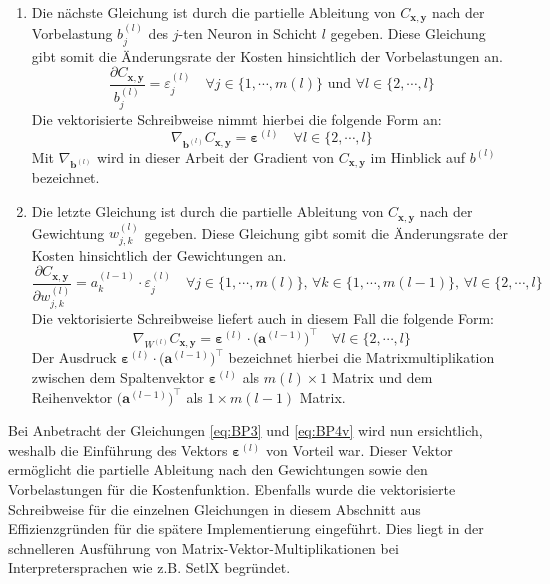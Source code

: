 \begin{enumerate}
\item Die nächste Gleichung ist durch die partielle Ableitung von $C_{\mathbf{x},\mathbf{y}}$ nach der Vorbelastung $b_j^{(l)}$ des $j$-ten Neuron in Schicht $l$ gegeben. Diese Gleichung gibt somit die Änderungsrate der Kosten hinsichtlich der Vorbelastungen an.
\begin{equation}
  \label{eq:BP3}
  \frac{\partial C_{\mathbf{x}, \mathbf{y}}}{b_j^{(l)}} = \varepsilon_j^{(l)}
  \quad \mbox{$\forall j \in \{1,\cdots,m(l)\}$ und $\forall l \in \{2, \cdots,l\}$} \tag{BP3}
\end{equation}
Die vektorisierte Schreibweise nimmt hierbei die folgende Form an:
\begin{equation}
  \label{eq:BP3v}
  \nabla_{\mathbf{b}^{(l)}} C_{\mathbf{x}, \mathbf{y}} = \boldsymbol{\varepsilon}^{(l)}
  \quad \mbox{$\forall l \in \{2, \cdots,l\}$} \tag{BP3v}
\end{equation}
Mit $\nabla_{\mathbf{b}^{(l)}}$ wird in dieser Arbeit der Gradient von $C_{\mathbf{x},\mathbf{y}}$ im Hinblick auf $b^{(l)}$ bezeichnet. 

\item Die letzte Gleichung ist durch die partielle Ableitung von $C_{\mathbf{x},\mathbf{y}}$ nach der Gewichtung $w_{j,k}^{(l)}$ gegeben. Diese Gleichung gibt somit die Änderungsrate der Kosten hinsichtlich der Gewichtungen an.
\begin{equation}
  \label{eq:BP4}
  \frac{\partial C_{\mathbf{x}, \mathbf{y}}}{\partial w_{j,k}^{(l)}} = a_k^{(l-1)} \cdot \varepsilon_j^{(l)}
  \quad \mbox{$\forall j \in \{1,\cdots,m(l)\}$, $\forall k \in \{1,\cdots,m(l-1)\}$, $\forall l \in \{2, \cdots,l\}$} \tag{BP4}
\end{equation}
Die vektorisierte Schreibweise liefert auch in diesem Fall die folgende Form:
\begin{equation}
  \label{eq:BP4v}
  \nabla_{W^{(l)}} C_{\mathbf{x}, \mathbf{y}} = \boldsymbol{\varepsilon}^{(l)} \cdot \bigl(\mathbf{a}^{(l-1)}\bigr)^\top
  \quad \mbox{$\forall l \in \{2, \cdots,l\}$} \tag{BP4v}
\end{equation}
Der Ausdruck $\boldsymbol{\varepsilon}^{(l)} \cdot \bigl(\mathbf{a}^{(l-1)}\bigr)^\top$ bezeichnet hierbei die Matrixmultiplikation zwischen dem Spaltenvektor $\boldsymbol{\varepsilon}^{(l)}$ als $m(l) \times 1$ Matrix und dem Reihenvektor $\bigl(\mathbf{a}^{(l-1)}\bigr)^\top$ als $1 \times m(l-1)$ Matrix.
\end{enumerate}

\noindent
Bei Anbetracht der Gleichungen \ref{eq:BP3} und \ref{eq:BP4v} wird nun ersichtlich, weshalb die Einführung des Vektors $\boldsymbol{\varepsilon}^{(l)}$ von Vorteil war. Dieser Vektor ermöglicht die partielle Ableitung nach den Gewichtungen sowie den Vorbelastungen für die Kostenfunktion. Ebenfalls wurde die vektorisierte Schreibweise für die einzelnen Gleichungen in diesem Abschnitt aus Effizienzgründen für die spätere Implementierung eingeführt. Dies liegt in der schnelleren Ausführung von Matrix-Vektor-Multiplikationen bei Interpretersprachen wie z.B. SetlX begründet. \\

